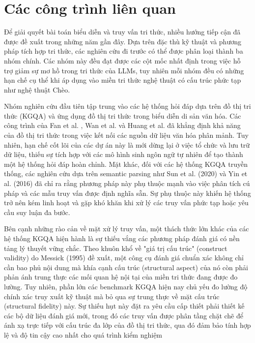 
\section{Các công trình liên quan}

Để giải quyết bài toán biểu diễn và truy vấn tri thức, nhiều hướng tiếp cận đã được đề xuất trong những năm gần đây. Dựa trên đặc thù kỹ thuật và phương pháp tích hợp tri thức, các nghiên cứu đi trước có thể được phân loại thành ba nhóm chính. Các nhóm này đều đạt được các cột mốc nhất định trong việc hỗ trợ giảm sự mơ hồ trong tri thức của LLMs, tuy nhiên mỗi nhóm đều có những hạn chế cụ thể khi áp dụng vào miền tri thức nghệ thuật có cấu trúc phức tạp như nghệ thuật Chèo.

Nhóm nghiên cứu đầu tiên tập trung vào các hệ thống hỏi đáp dựa trên đồ thị tri thức (KGQA) và ứng dụng đồ thị tri thức trong biểu diễn di sản văn hóa. Các công trình của Fan et al. \cite{fan2023cichmkg}, Wan et al. \cite{wan2024wumkg} và Huang et al. \cite{huang2023using} đã khẳng định khả năng của đồ thị tri thức trong việc kết nối các nguồn dữ liệu văn hóa phân mảnh. Tuy nhiên, hạn chế cốt lõi của các dự án này là mới dừng lại ở việc tổ chức và lưu trữ dữ liệu, thiếu sự tích hợp với các mô hình sinh ngôn ngữ tự nhiên để tạo thành một hệ thống hỏi đáp hoàn chỉnh. Mặt khác, đối với các hệ thống KGQA truyền thống, các nghiên cứu dựa trên semantic parsing như Sun et al. (2020)\cite{sun2020sparqa} và Yin et al. (2016) \cite{yih2015semantic} đã chỉ ra rằng phương pháp này phụ thuộc mạnh vào việc phân tích cú pháp và các mẫu truy vấn được định nghĩa sẵn. Sự phụ thuộc này khiến hệ thống trở nên kém linh hoạt và gặp khó khăn khi xử lý các truy vấn phức tạp hoặc yêu cầu suy luận đa bước.

Bên cạnh những rào cản về mặt xử lý truy vấn, một thách thức lớn khác của các hệ thống KGQA hiện hành là sự thiếu vắng các phương pháp đánh giá có nền tảng lý thuyết vững chắc. Theo khuôn khổ về "giá trị cấu trúc" (construct validity) do Messick (1995) \cite{messick1995validity} đề xuất, một công cụ đánh giá chuẩn xác không chỉ cần bao phủ nội dung mà khía cạnh cấu trúc (structural aspect) của nó còn phải phản ánh trung thực các mối quan hệ nội tại của miền tri thức đang được đo lường. Tuy nhiên, phần lớn các benchmark KGQA hiện nay chủ yếu đo lường độ chính xác truy xuất kỹ thuật mà bỏ qua sự trung thực về mặt cấu trúc (structural fidelity) này. Sự thiếu hụt này đặt ra yêu cầu cấp thiết phải thiết kế các bộ dữ liệu đánh giá mới, trong đó các truy vấn được phân tầng chặt chẽ để ánh xạ trực tiếp với cấu trúc đa lớp của đồ thị tri thức, qua đó đảm bảo tính hợp lệ và độ tin cậy cao nhất cho quá trình kiểm nghiệm

